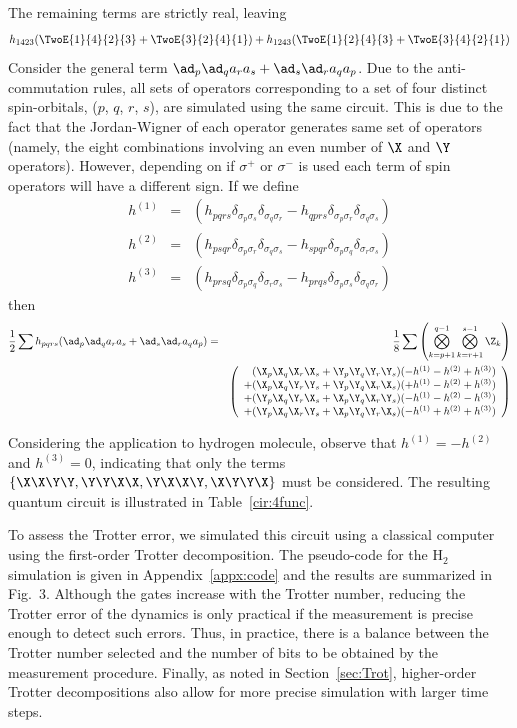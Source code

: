 \documentclass[11pt,oneside,final]{huthesis}%
\begin{document}
The remaining terms are strictly real, leaving
\[h_{1423}(\TwoE{1}{4}{2}{3}+\TwoE{3}{2}{4}{1})+h_{1243}(\TwoE{1}{2}{4}{3}+\TwoE{3}{4}{2}{1})\]
Consider the general term $\ad_p\ad_qa_r a_s+\ad_s\ad_ra_q a_p$.  Due to the anti-commutation rules, all sets of operators
corresponding to a set of four distinct spin-orbitals, ($p$, $q$, $r$, $s$), are simulated using the same circuit.
This is due to the fact that the Jordan-Wigner of each operator generates same set of operators (namely, the eight 
combinations involving an even number of $\X$ and $\Y$ operators).  However, depending on if $\sigma^+$ or $\sigma^-$ is 
used each term of spin operators will have a different sign. If we define
\begin{eqnarray}
	h^{(1)}&=& (h_{pqrs}\delta_{\sigma_p\sigma_s}\delta_{\sigma_q\sigma_r}-h_{qprs}\delta_{\sigma_p\sigma_r}\delta_{\sigma_q\sigma_s})\label{eq:h1}\\
	h^{(2)}&=& (h_{psqr}\delta_{\sigma_p\sigma_r}\delta_{\sigma_q\sigma_s}-h_{spqr}\delta_{\sigma_p\sigma_q}\delta_{\sigma_r\sigma_s})\label{eq:h2}\\
	h^{(3)}&=& (h_{prsq}\delta_{\sigma_p\sigma_q}\delta_{\sigma_r\sigma_s}-h_{prqs}\delta_{\sigma_p\sigma_s}\delta_{\sigma_q\sigma_r})\label{eq:h3}
\end{eqnarray}
then
\begin{eqnarray}
	\frac{1}{2}\sum {h}_{pqrs}(\ad_p\ad_qa_r a_s+\ad_s\ad_ra_q a_p)&=&\frac{1}{8}\sum\left(\bigotimes_{k=p+1}^{q-1}\bigotimes_{k=r+1}^{s-1} \Z_k\right)\\
		&&	\left(
	\begin{array}{l}
		\phantom{+} (\X_p\X_q\X_r\X_s+\Y_p\Y_q\Y_r\Y_s)(-h^{(1)}-h^{(2)}+h^{(3)})\\
		+(\X_p\X_q\Y_r\Y_s+\Y_p\Y_q\X_r\X_s)(+h^{(1)}-h^{(2)}+h^{(3)})\\
		+(\Y_p\X_q\Y_r\X_s+\X_p\Y_q\X_r\Y_s)(-h^{(1)}-h^{(2)}-h^{(3)})\\
		+(\Y_p\X_q\X_r\Y_s+\X_p\Y_q\Y_r\X_s)(-h^{(1)}+h^{(2)}+h^{(3)})
		 \end{array} \right)\nonumber
	\label{eq:EEop}
\end{eqnarray}


Considering the application to hydrogen molecule, observe that $h^{(1)}=-h^{(2)}$ and $h^{(3)}=0$, indicating that only the terms $\{\X\X\Y\Y,\Y\Y\X\X,\Y\X\X\Y,\X\Y\Y\X\}$ must be considered. The resulting quantum circuit is illustrated in Table~\ref{cir:4func}.

To assess the Trotter error, we simulated this circuit using a classical computer using the first-order Trotter decomposition. The pseudo-code for the H$_2$ simulation is given in Appendix~\ref{appx:code} and the results are summarized in Fig.~3. Although the gates increase with the Trotter number, reducing the Trotter error of the dynamics is only practical if the measurement is precise enough to detect such errors.  Thus, in practice, there is a balance between the Trotter number selected and the number of bits to be obtained by the measurement procedure. 
Finally, as noted in Section~\ref{sec:Trot}, higher-order Trotter decompositions also allow 
for more precise simulation with larger time steps. 
\end{document}
